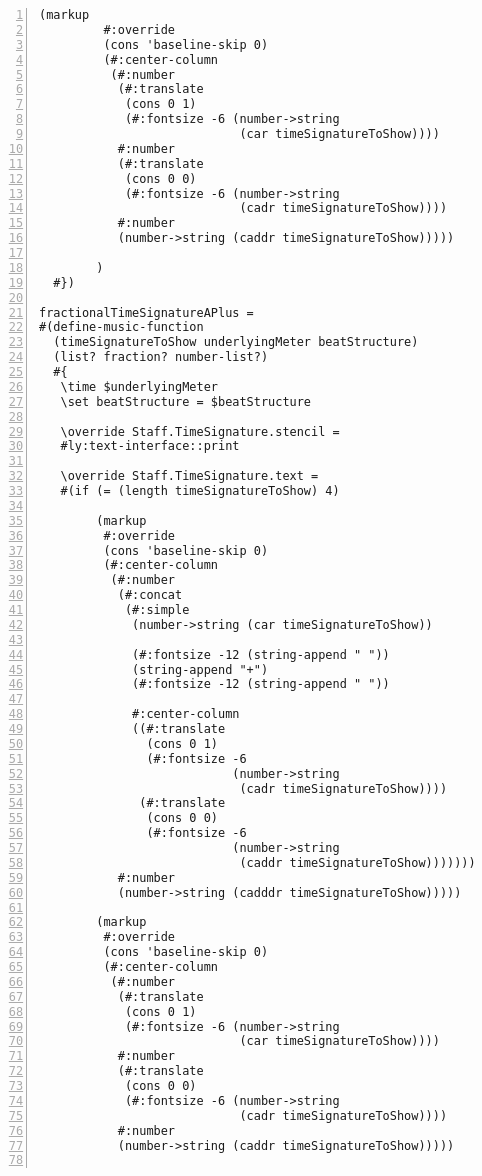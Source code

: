 \begin{Verbatim}[numbers=left,xleftmargin=5mm]
        (markup
         #:override
         (cons 'baseline-skip 0)
         (#:center-column
          (#:number
           (#:translate
            (cons 0 1)
            (#:fontsize -6 (number->string
                            (car timeSignatureToShow))))
           #:number
           (#:translate
            (cons 0 0)
            (#:fontsize -6 (number->string
                            (cadr timeSignatureToShow))))
           #:number
           (number->string (caddr timeSignatureToShow)))))

        )
  #})

fractionalTimeSignatureAPlus =
#(define-music-function
  (timeSignatureToShow underlyingMeter beatStructure)
  (list? fraction? number-list?)
  #{
   \time $underlyingMeter
   \set beatStructure = $beatStructure

   \override Staff.TimeSignature.stencil =
   #ly:text-interface::print

   \override Staff.TimeSignature.text =
   #(if (= (length timeSignatureToShow) 4)

        (markup
         #:override
         (cons 'baseline-skip 0)
         (#:center-column
          (#:number
           (#:concat
            (#:simple
             (number->string (car timeSignatureToShow))

             (#:fontsize -12 (string-append " "))
             (string-append "+")
             (#:fontsize -12 (string-append " "))

             #:center-column
             ((#:translate
               (cons 0 1)
               (#:fontsize -6
                           (number->string
                            (cadr timeSignatureToShow))))
              (#:translate
               (cons 0 0)
               (#:fontsize -6
                           (number->string
                            (caddr timeSignatureToShow)))))))
           #:number
           (number->string (cadddr timeSignatureToShow)))))

        (markup
         #:override
         (cons 'baseline-skip 0)
         (#:center-column
          (#:number
           (#:translate
            (cons 0 1)
            (#:fontsize -6 (number->string
                            (car timeSignatureToShow))))
           #:number
           (#:translate
            (cons 0 0)
            (#:fontsize -6 (number->string
                            (cadr timeSignatureToShow))))
           #:number
           (number->string (caddr timeSignatureToShow)))))


\end{Verbatim}

